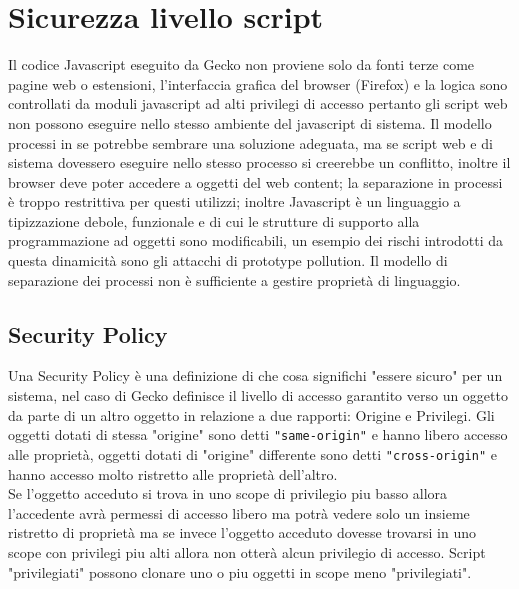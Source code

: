 \documentclass{sapthesis}
\newcommand{\code}[1]{\texttt{#1}}
\begin{document}
    \section{Sicurezza livello script}
    \label{sec:sicurezza-script}
        Il codice Javascript eseguito da Gecko non proviene solo da fonti terze come pagine web o estensioni,
        l'interfaccia grafica del browser (Firefox) e la logica sono controllati da moduli javascript ad
        alti privilegi di accesso pertanto gli script web non possono eseguire nello stesso ambiente del
        javascript di sistema. Il modello processi in se potrebbe sembrare una soluzione adeguata, ma se
        script web e di sistema dovessero eseguire nello stesso processo si creerebbe un conflitto, inoltre
        il browser deve poter accedere a oggetti del web content; la separazione in processi è troppo 
        restrittiva per questi utilizzi; inoltre Javascript è un linguaggio a tipizzazione debole, funzionale
        e di cui le strutture di supporto alla programmazione ad oggetti sono modificabili, un esempio dei
        rischi introdotti da questa dinamicità sono gli attacchi di prototype pollution. Il modello di
        separazione dei processi non è sufficiente a gestire proprietà di linguaggio.

        \subsection{Security Policy}
        \label{sec:sicurezza-script-security-policy}
            Una Security Policy è una definizione di che cosa significhi "essere sicuro" per un sistema,
            nel caso di Gecko definisce il livello di accesso garantito verso un oggetto da parte di un
            altro oggetto in relazione a due rapporti: Origine e Privilegi.
            Gli oggetti dotati di stessa "origine" sono detti \code{"same-origin"} e hanno libero accesso
            alle proprietà, oggetti dotati di "origine" differente sono detti \code{"cross-origin"}
            e hanno accesso molto ristretto alle proprietà dell'altro.\\
            Se l'oggetto acceduto si trova in uno scope di privilegio piu basso allora l'accedente avrà
            permessi di accesso libero ma potrà vedere solo un insieme ristretto di proprietà ma se invece
            l'oggetto acceduto dovesse trovarsi in uno scope con privilegi piu alti allora non otterà 
            alcun privilegio di accesso. Script "privilegiati" possono clonare uno o piu oggetti in
            scope meno "privilegiati".
\end{document}
